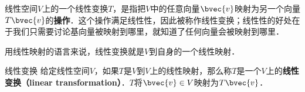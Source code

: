 

\begin{issues}
\issueDraft
{}
\end{issues}




线性空间$V$上的一个线性变换$T$，是指把$V$中的任意向量$\bvec{v}$映射为另一个向量$T\bvec{v}$的\textbf{操作}．这个操作满足线性性，因此被称作线性变换；线性性的好处在于我们只需要讨论基向量被映射到哪里，就知道了任何向量会被映射到哪里．

用线性映射的语言来说，线性变换就是$V$到自身的一个线性映射．

\begin{definition}{线性变换}
给定线性空间$V$，如果$T$是$V$到$V$上的线性映射，那么称$T$是一个$V$上的\textbf{线性变换（linear transformation）}．$T$将$\bvec{v}\in V$映射为$T\bvec{v}$．
\end{definition}




